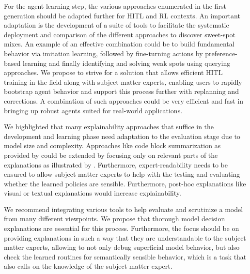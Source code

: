 \documentclass[twoside,11pt]{article}
\begin{document}
\begin{enumerate}
For the agent learning step, the various approaches enumerated in the first generation should be adapted further for HITL and RL contexts. An important adaptation is the development of a suite of tools to facilitate the systematic deployment and comparison of the different approaches to discover sweet-spot mixes. An example of an effective combination could be to build fundamental behavior via imitation learning, followed by fine-turning actions by preference-based learning and finally identifying and solving weak spots using querying approaches. We propose to strive for a solution that allows efficient HITL training in the field along with subject matter experts, enabling users to rapidly bootstrap agent behavior and support this process further with replanning and corrections. A combination of such approaches could be very efficient and fast in bringing up robust agents suited for real-world applications.


We highlighted that many explainability approaches that suffice in the development and learning phase need adaptation to the evaluation stage due to model size and complexity. Approaches like code block summarization as provided by \citet{VermaEtAl:2018:ProgrammaticallyInterpretableRL} could be extended by focusing only on relevant parts of the explanations as illustrated by \citet{Vu:2020:PGMExplainer}. Furthermore, expert-readability needs to be ensured to allow subject matter experts to help with the testing and evaluating whether the learned policies are sensible.
Furthermore, post-hoc explanations like visual \citep{DBLP:journals/corr/abs-1912-12191,DBLP:journals/corr/abs-1912-05743} or textual \citep{fukuchi2017autonomous,HayesShah:2017:AutonomousPolicyExplanation} explanations would increase explainability.

We recommend integrating various tools to help evaluate and scrutinize a model from many different viewpoints. We propose that thorough model decision explanations are essential for this process. Furthermore, the focus should be on providing explanations in such a way that they are understandable to the subject matter experts, allowing to not only debug superficial model behavior, but also check the learned routines for semantically sensible behavior, which is a task that also calls on the knowledge of the subject matter expert.



\end{enumerate}
\end{document}
